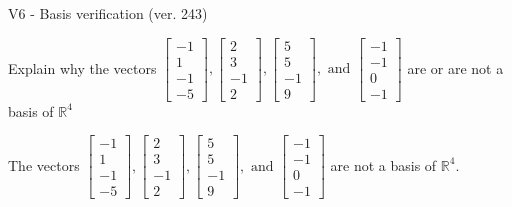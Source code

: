 \begin{exercise}
  \begin{exerciseTitle}V6 - Basis verification (ver. 243)\end{exerciseTitle}
  \begin{exerciseStatement}
    Explain why the vectors \(\left[\begin{array}{r}
-1 \\
1 \\
-1 \\
-5
\end{array}\right] , \left[\begin{array}{r}
2 \\
3 \\
-1 \\
2
\end{array}\right] , \left[\begin{array}{r}
5 \\
5 \\
-1 \\
9
\end{array}\right] , \text{ and } \left[\begin{array}{r}
-1 \\
-1 \\
0 \\
-1
\end{array}\right]\) are or are not a basis of \(\mathbb{R}^4\)	


  \end{exerciseStatement}
  \begin{exerciseAnswer}
   The vectors \(\left[\begin{array}{r}
-1 \\
1 \\
-1 \\
-5
\end{array}\right] , \left[\begin{array}{r}
2 \\
3 \\
-1 \\
2
\end{array}\right] , \left[\begin{array}{r}
5 \\
5 \\
-1 \\
9
\end{array}\right] , \text{ and } \left[\begin{array}{r}
-1 \\
-1 \\
0 \\
-1
\end{array}\right]\) 
  	 are not  a basis of \(\mathbb{R}^4\).
  


  \end{exerciseAnswer}
\end{exercise}